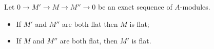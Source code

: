 Let $0 \to M' \to M \to M'' \to 0$ be an exact sequence of $A$-modules.
\begin{itemize}
\item If $M'$ and $M''$ are both flat then $M$ is flat;
\item If $M$ and $M''$ are both flat, then $M'$ is flat.
\end{itemize}
